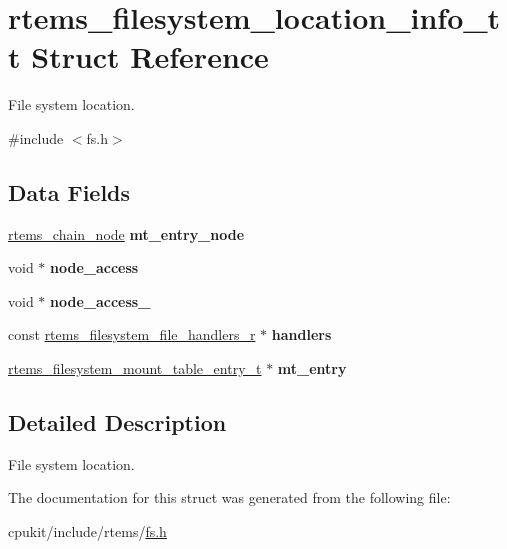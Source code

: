 \hypertarget{structrtems__filesystem__location__info__tt}{}\section{rtems\+\_\+filesystem\+\_\+location\+\_\+info\+\_\+tt Struct Reference}
\label{structrtems__filesystem__location__info__tt}


File system location.  




{\ttfamily \#include $<$fs.\+h$>$}

\subsection*{Data Fields}
\begin{DoxyCompactItemize}
\item 
\mbox{\label{structrtems__filesystem__location__info__tt_aa2d348b88048cd5c600334d51af981e2}} 
\mbox{\hyperlink{structChain__Node__struct}{rtems\+\_\+chain\+\_\+node}} {\bfseries mt\+\_\+entry\+\_\+node}
\item 
\mbox{\label{structrtems__filesystem__location__info__tt_a02952e6cb8e5b7299ee12af6aa6f19e6}} 
void $\ast$ {\bfseries node\+\_\+access}
\item 
\mbox{\label{structrtems__filesystem__location__info__tt_aed32e9f74d81e67c8d4cf3583441cf29}} 
void $\ast$ {\bfseries node\+\_\+access\+\_}
\item 
\mbox{\label{structrtems__filesystem__location__info__tt_aee0fb4fda101df9ce8dd9c10cad50d64}} 
const \mbox{\hyperlink{struct__rtems__filesystem__file__handlers__r}{rtems\+\_\+filesystem\+\_\+file\+\_\+handlers\+\_\+r}} $\ast$ {\bfseries handlers}
\item 
\mbox{\label{structrtems__filesystem__location__info__tt_a43141560061425c2164b5b7289e508de}} 
\mbox{\hyperlink{structrtems__filesystem__mount__table__entry__tt}{rtems\+\_\+filesystem\+\_\+mount\+\_\+table\+\_\+entry\+\_\+t}} $\ast$ {\bfseries mt\+\_\+entry}
\end{DoxyCompactItemize}


\subsection{Detailed Description}
File system location. 

The documentation for this struct was generated from the following file\+:\begin{DoxyCompactItemize}
\item 
cpukit/include/rtems/\mbox{\hyperlink{include_2rtems_2fs_8h}{fs.\+h}}\end{DoxyCompactItemize}
